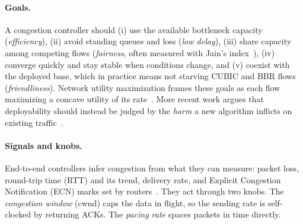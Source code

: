\paragraph{Goals.} A congestion controller should (i) use the available bottleneck capacity (\emph{efficiency}), (ii) avoid standing queues and loss (\emph{low delay}), (iii) share capacity among competing flows (\emph{fairness}, often measured with Jain's index~\cite{jain1984fairness}), (iv) converge quickly and stay stable when conditions change, and (v) coexist with the deployed base, which in practice means not starving CUBIC and BBR flows (\emph{friendliness}). Network utility maximization frames these goals as each flow maximizing a concave utility of its rate~\cite{kelly1998rate}. More recent work argues that deployability should instead be judged by the \emph{harm} a new algorithm inflicts on existing traffic~\cite{ware2019beyond}.

\paragraph{Signals and knobs.} End-to-end controllers infer congestion from what they can measure: packet loss, round-trip time (RTT) and its trend, delivery rate, and Explicit Congestion Notification (ECN) marks set by routers~\cite{rfc3168}. They act through two knobs. The \emph{congestion window} (cwnd) caps the data in flight, so the sending rate is self-clocked by returning ACKs. The \emph{pacing rate} spaces packets in time directly.

